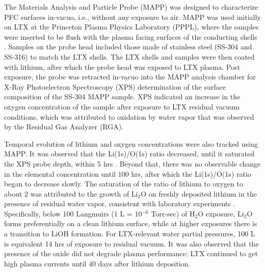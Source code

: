 \documentclass[aip,rsi,amsmath,amssymb,reprint]{revtex4-1}
\begin{document}
The Materials Analysis and Particle Probe (MAPP) was designed to characterize PFC surfaces in-vacuo, i.e., without any exposure to air. MAPP was used initially on LTX at the Princeton Plasma Physics Laboratory (PPPL), where the samples were inserted to be flush with the plasma facing surfaces of the conducting shells \cite{lucia-paper, lucia-thesis}. Samples on the probe head included those made of stainless steel (SS-304 and SS-316) to match the LTX shells. The LTX shells and samples were then coated with lithium, after which the probe head was exposed to LTX plasma. Post exposure, the probe was retracted in-vacuo into the MAPP analysis chamber for X-Ray Photoelectron Spectroscopy (XPS) determination of the surface composition of the SS-304 MAPP sample. XPS indicated an increase in the oxygen concentration of the sample after exposure to LTX residual vacuum conditions, which was attributed to oxidation by water vapor that was observed by the Residual Gas Analyzer (RGA).


Temporal evolution of lithium and oxygen concentrations were also tracked using MAPP. It was observed that the Li(1s)/O(1s) ratio decreased, until it saturated the XPS probe depth, within 5 hrs \cite{lucia-thesis,lucia-paper}. Beyond that, there was no observable change in the elemental concentration until 100 hrs, after which the Li(1s)/O(1s) ratio began to decrease slowly. The saturation of the ratio of lithium to oxygen to about 2 was attributed to the growth of Li$_2$O on freshly deposited lithium in the presence of residual water vapor, consistent with laboratory experiments \cite{50,51}. Specifically, below 100 Langmuirs (1 L = 10$^{-6}$ Torr-sec) of H$_2$O exposure, Li$_2$O forms preferentially on a clean lithium surface, while at higher exposures there is a transition to LiOH formation. For LTX-relevant water partial pressures, 100 L is equivalent 14 hrs of exposure to residual vacuum. It was also observed that the presence of the oxide did not degrade plasma performance; LTX continued to get high plasma currents until 40 days after lithium deposition\cite{bob-lucia}. 
\end{document}
